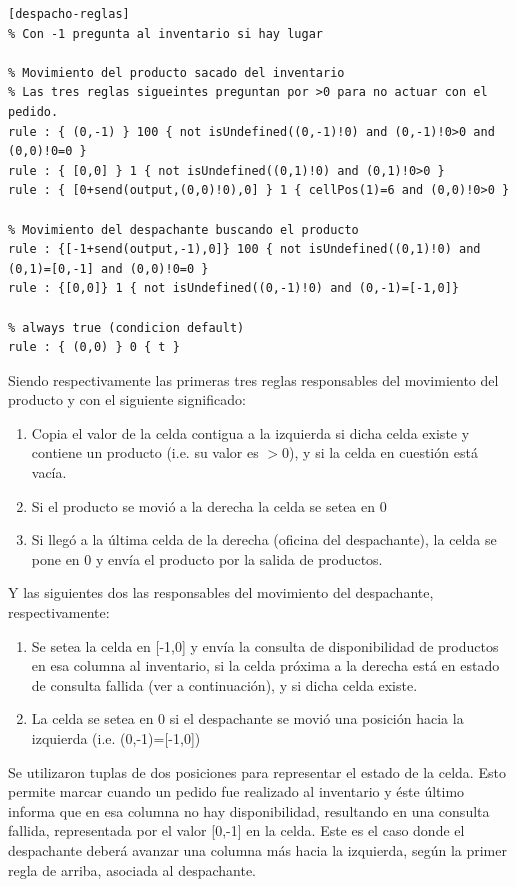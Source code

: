 \documentclass[10pt]{article}
\begin{document}
\begin{minipage}{1\textwidth}
	\centering
	\begin{lstlisting}
[despacho-reglas]
% Con -1 pregunta al inventario si hay lugar

% Movimiento del producto sacado del inventario
% Las tres reglas sigueintes preguntan por >0 para no actuar con el pedido.
rule : { (0,-1) } 100 { not isUndefined((0,-1)!0) and (0,-1)!0>0 and (0,0)!0=0 }
rule : { [0,0] } 1 { not isUndefined((0,1)!0) and (0,1)!0>0 }
rule : { [0+send(output,(0,0)!0),0] } 1 { cellPos(1)=6 and (0,0)!0>0 }

% Movimiento del despachante buscando el producto
rule : {[-1+send(output,-1),0]} 100 { not isUndefined((0,1)!0) and (0,1)=[0,-1] and (0,0)!0=0 }
rule : {[0,0]} 1 { not isUndefined((0,-1)!0) and (0,-1)=[-1,0]}

% always true (condicion default)
rule : { (0,0) } 0 { t }
	\end{lstlisting}
\end{minipage}

Siendo respectivamente las primeras tres reglas responsables del movimiento del producto y con el siguiente significado:
\begin{enumerate}
	\item Copia el valor de la celda contigua a la izquierda si dicha celda existe y contiene un producto (i.e. su valor es $>0$), y si la celda en cuestión está vacía.
	\item Si el producto se movió a la derecha la celda se setea en 0
	\item Si llegó a la última celda de la derecha (oficina del despachante), la celda se pone en 0 y envía el producto por la salida de productos.
\end{enumerate}

Y las siguientes dos las responsables del movimiento del despachante, respectivamente:
\begin{enumerate}
	\item Se setea la celda en [-1,0] y envía la consulta de disponibilidad de productos en esa columna al inventario, si la celda próxima a la derecha está en estado de consulta fallida (ver a continuación), y si dicha celda existe.
	\item La celda se setea en 0 si el despachante se movió una posición hacia la izquierda (i.e. (0,-1)=[-1,0])
\end{enumerate}

Se utilizaron tuplas de dos posiciones para representar el estado de la celda. Esto permite marcar cuando un pedido fue realizado al inventario y éste último informa que en esa columna no hay disponibilidad, resultando en una consulta fallida, representada por el valor [0,-1] en la celda. Este es el caso donde el despachante deberá avanzar una columna más hacia la izquierda, según la primer regla de arriba, asociada al despachante.
\end{document}
